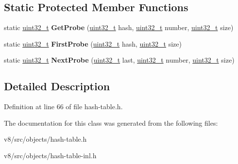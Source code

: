 \subsection*{Static Protected Member Functions}
\begin{DoxyCompactItemize}
\item 
\mbox{\label{classv8_1_1internal_1_1HashTableBase_aa259e268c7f58639ab33414e5adb04c4}} 
static \mbox{\hyperlink{classuint32__t}{uint32\+\_\+t}} {\bfseries Get\+Probe} (\mbox{\hyperlink{classuint32__t}{uint32\+\_\+t}} hash, \mbox{\hyperlink{classuint32__t}{uint32\+\_\+t}} number, \mbox{\hyperlink{classuint32__t}{uint32\+\_\+t}} size)
\item 
\mbox{\label{classv8_1_1internal_1_1HashTableBase_a771b91b666da8b9c60060f2061b2635f}} 
static \mbox{\hyperlink{classuint32__t}{uint32\+\_\+t}} {\bfseries First\+Probe} (\mbox{\hyperlink{classuint32__t}{uint32\+\_\+t}} hash, \mbox{\hyperlink{classuint32__t}{uint32\+\_\+t}} size)
\item 
\mbox{\label{classv8_1_1internal_1_1HashTableBase_a14b520de3484f55cc4a726a872f31547}} 
static \mbox{\hyperlink{classuint32__t}{uint32\+\_\+t}} {\bfseries Next\+Probe} (\mbox{\hyperlink{classuint32__t}{uint32\+\_\+t}} last, \mbox{\hyperlink{classuint32__t}{uint32\+\_\+t}} number, \mbox{\hyperlink{classuint32__t}{uint32\+\_\+t}} size)
\end{DoxyCompactItemize}


\subsection{Detailed Description}


Definition at line 66 of file hash-\/table.\+h.



The documentation for this class was generated from the following files\+:\begin{DoxyCompactItemize}
\item 
v8/src/objects/hash-\/table.\+h\item 
v8/src/objects/hash-\/table-\/inl.\+h\end{DoxyCompactItemize}
